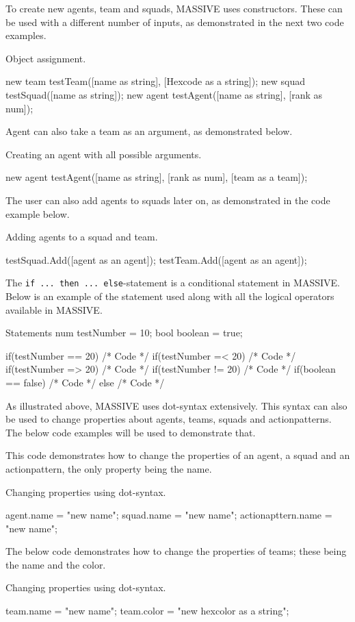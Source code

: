 To create new agents, team and squads, MASSIVE uses constructors. These can be used with a different number of inputs, as demonstrated in the next two code examples.
\begin{source}{Object assignment.}{}

new team testTeam([name as string], [Hexcode as a string]);
new squad testSquad([name as string]);
new agent testAgent([name as string], [rank as num]);

\end{source}

Agent can also take a team as an argument, as demonstrated below.
\begin{source}{Creating an agent with all possible arguments.}{}

new agent testAgent([name as string], [rank as num], [team as a team]);

\end{source}

The user can also add agents to squads later on, as demonstrated in the code example below.
\begin{source}{Adding agents to a squad and team.}{}

testSquad.Add([agent as an agent]);
testTeam.Add([agent as an agent]);

\end{source}

The \texttt{if ... then ... else}-statement is a conditional statement in MASSIVE. Below is an example of the statement used along with all the logical operators available in MASSIVE.

\begin{source}{Statements}{}
num testNumber = 10;
bool boolean = true;

if(testNumber == 20)
{
		/* Code */
}
if(testNumber =< 20)
{
		/* Code */
}
if(testNumber => 20)
{
		/* Code */
}
if(testNumber != 20)
{
		/* Code */
}
if(boolean == false)
{
		/* Code */
}
else
{
		/* Code */
}
\end{source}

As illustrated above, MASSIVE uses dot-syntax extensively. This syntax can also be used to change properties about agents, teams, squads and actionpatterns. The below code examples will be used to demonstrate that.

This code demonstrates how to change the properties of an agent, a squad and an actionpattern, the only property being the name.

\begin{source}{Changing properties using dot-syntax.}{}

agent.name = "new name";
squad.name = "new name";
actionapttern.name = "new name";

\end{source}

The below code demonstrates how to change the properties of teams; these being the name and the color.

\begin{source}{Changing properties using dot-syntax.}{}

team.name = "new name";
team.color = "new hexcolor as a string";

\end{source}

